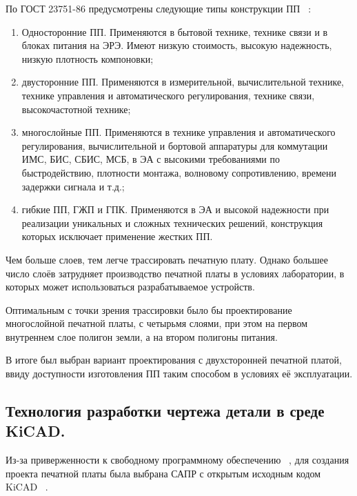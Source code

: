 По ГОСТ 23751-86 предусмотрены следующие типы конструкции ПП
~\cite{PirogovaEngineering}:
\begin{enumerate}

\item Односторонние ПП. Применяются в бытовой технике, технике связи и
  в блоках питания на ЭРЭ. Имеют низкую стоимость, высокую надежность,
  низкую плотность компоновки;

\item двусторонние ПП. Применяются в измерительной, вычислительной
  технике, технике управления и автоматического регулирования,
  технике связи, высокочастотной технике;

\item многослойные ПП. Применяются в технике управления и
  автоматического регулирования,
  вычислительной и бортовой аппаратуры для
  коммутации ИМС, БИС, СБИС, МСБ, в ЭА с высокими требованиями по быстродействию,
  плотности монтажа,  волновому сопротивлению, времени задержки сигнала и т.д.;

\item гибкие ПП, ГЖП и ГПК. Применяются в ЭА и высокой надежности
  при реализации уникальных и сложных технических решений,
  конструкция которых исключает применение жестких ПП.
\end{enumerate}

Чем больше слоев, тем легче трассировать печатную плату.
Однако большее число слоёв затрудняет производство печатной платы
в условиях лаборатории, в которых может использоваться разрабатываемое
устройств.

Оптимальным с точки зрения трассировки было бы проектирование
многослойной печатной платы, с четырьмя слоями, при этом на первом
внутреннем слое полигон земли, а на втором полигоны питания.

В итоге был выбран вариант проектирования с двухсторонней печатной платой,
ввиду доступности изготовления ПП таким способом в условиях её
эксплуатации.


\subsection{Технология разработки чертежа детали в среде KiCAD.}
Из-за приверженности к свободному программному обеспечению
~\cite{GNU-philosophy}, для создания проекта печатной платы была
выбрана САПР с открытым исходным кодом KiCAD
~\cite{kicad-license}.

